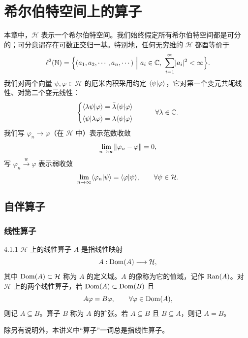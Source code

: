 
\chapter{希尔伯特空间上的算子}

本章中，$\mathcal{H}$ 表示一个希尔伯特空间。我们始终假定所有希尔伯特空间都是可分的；可分意谓存在可数正交归一基。特别地，任何无穷维的 $\mathcal{H}$ 都酉等价于
\[
\ell^2(\N)=\Bigl\{(a_1,a_2,\cdots,a_n,\cdots)\ \Big|\ a_i\in\C,\ \sum_{i=1}^{\infty}\abs{a_i}^2<\infty\Bigr\}.
\]
我们对两个向量 $\psi,\varphi\in\mathcal{H}$ 的厄米内积采用约定 $\langle \psi|\varphi\rangle$，它对第一个变元共轭线性、对第二个变元线性：
\[
\begin{cases}
\langle \lambda\psi|\varphi\rangle=\bar\lambda\langle \psi|\varphi\rangle\\[1mm]
\langle \psi|\lambda\varphi\rangle=\lambda\langle \psi|\varphi\rangle
\end{cases}
\qquad \forall\lambda\in\mathbb{C}.
\]
我们写 $\varphi_n\to\varphi$（在 $\mathcal{H}$ 中）表示范数收敛
\[
\lim_{n\to\infty}\lVert \varphi_n-\varphi\rVert=0,
\]
写 $\varphi_n\xrightarrow{\ w\ }\varphi$ 表示弱收敛
\[
\lim_{n\to\infty}\langle \varphi_n|\psi\rangle=\langle \varphi|\psi\rangle,\qquad \forall\psi\in\mathcal{H}.
\]

\section{自伴算子}

\subsection{线性算子}

\begin{definition}{4.1.1}
  $\mathcal{H}$ 上的线性算子 $A$ 是指线性映射
  \[
  A:\operatorname{Dom}(A)\longrightarrow\mathcal{H},
  \]
  其中 $\operatorname{Dom}(A)\subset\mathcal{H}$ 称为 $A$ 的定义域。$A$ 的像称为它的值域，记作 $\operatorname{Ran}(A)$。对 $\mathcal{H}$ 上的两个线性算子，若 $\operatorname{Dom}(A)\subset\operatorname{Dom}(B)$ 且
  \[
  A\varphi=B\varphi,\qquad\forall\varphi\in\operatorname{Dom}(A),
  \]
  则记 $A\subseteq B$。算子 $B$ 称为 $A$ 的扩张。若 $A\subseteq B$ 且 $B\subseteq A$，则记 $A=B$。
\end{definition}

除另有说明外，本讲义中“算子”一词总是指线性算子。

